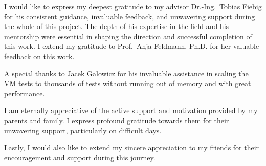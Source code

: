 
I would like to express my deepest gratitude to my advisor Dr.-Ing.~Tobias Fiebig for his consistent guidance, invaluable feedback, and unwavering support during the whole of this project.
The depth of his expertise in the field and his mentorship were essential in shaping the direction and successful completion of this work.
I extend my gratitude to Prof.~Anja Feldmann, Ph.D. for her valuable feedback on this work.

A special thanks to Jacek Galowicz for his invaluable assistance in scaling the VM tests to thousands of tests without running out of memory and with great performance.

I am eternally appreciative of the active support and motivation provided by my parents and family.
I express profound gratitude towards them for their unwavering support, particularly on difficult days.

Lastly, I would also like to extend my sincere appreciation to my friends for their encouragement and support during this journey.


